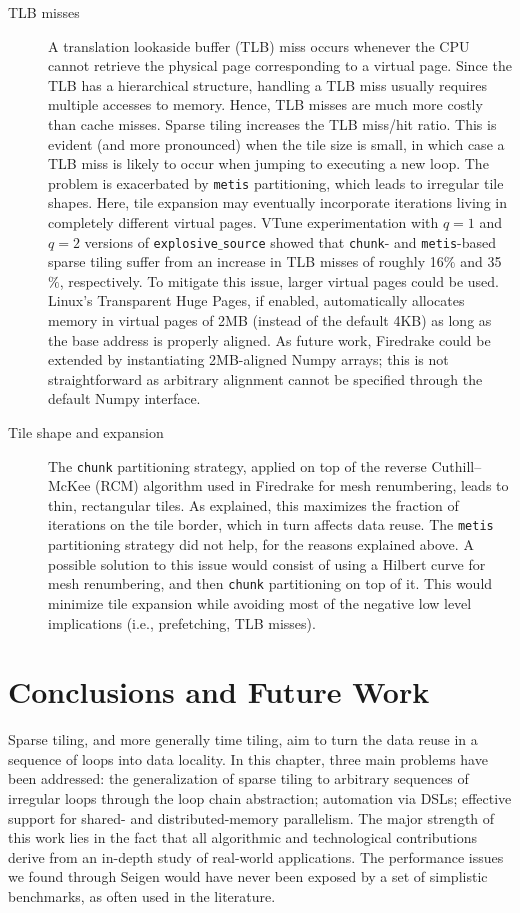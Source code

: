 \begin{description}
\item[TLB misses] A translation lookaside buffer (TLB) miss occurs whenever the CPU cannot retrieve the physical page corresponding to a virtual page. Since the TLB has a hierarchical structure, handling a TLB miss usually requires multiple accesses to memory. Hence, TLB misses are much more costly than cache misses. Sparse tiling increases the TLB miss/hit ratio. This is evident (and more pronounced) when the tile size is small, in which case a TLB miss is likely to occur when jumping to executing a new loop. The problem is exacerbated by {\tt metis} partitioning, which leads to irregular tile shapes. Here, tile expansion may eventually incorporate iterations living in completely different virtual pages. VTune experimentation with $q=1$ and $q=2$ versions of {\tt explosive$\_$source} showed that {\tt chunk}- and {\tt metis}-based sparse tiling suffer from an increase in TLB misses of roughly 16$\%$ and 35$\%$, respectively. To mitigate this issue, larger virtual pages could be used. Linux's Transparent Huge Pages, if enabled, automatically allocates memory in virtual pages of 2MB (instead of the default 4KB) as long as the base address is properly aligned. As future work, Firedrake could be extended by instantiating 2MB-aligned Numpy arrays; this is not straightforward as arbitrary alignment cannot be specified through the default Numpy interface.

\item[Tile shape and expansion] The {\tt chunk} partitioning strategy, applied on top of the reverse Cuthill–McKee (RCM) algorithm used in Firedrake for mesh renumbering, leads to thin, rectangular tiles. As explained, this maximizes the fraction of iterations on the tile border, which in turn affects data reuse. The {\tt metis} partitioning strategy did not help, for the reasons explained above. A possible solution to this issue would consist of using a Hilbert curve for mesh renumbering, and then {\tt chunk} partitioning on top of it. This would minimize tile expansion while avoiding most of the negative low level implications (i.e., prefetching, TLB misses). 

\end{description}

\section{Conclusions and Future Work}
Sparse tiling, and more generally time tiling, aim to turn the data reuse in a sequence of loops into data locality. In this chapter, three main problems have been addressed: the generalization of sparse tiling to arbitrary sequences of irregular loops through the loop chain abstraction; automation via DSLs; effective support for shared- and distributed-memory parallelism. The major strength of this work lies in the fact that all algorithmic and technological contributions derive from an in-depth study of real-world applications. The performance issues we found through Seigen would have never been exposed by a set of simplistic benchmarks, as often used in the literature. 

